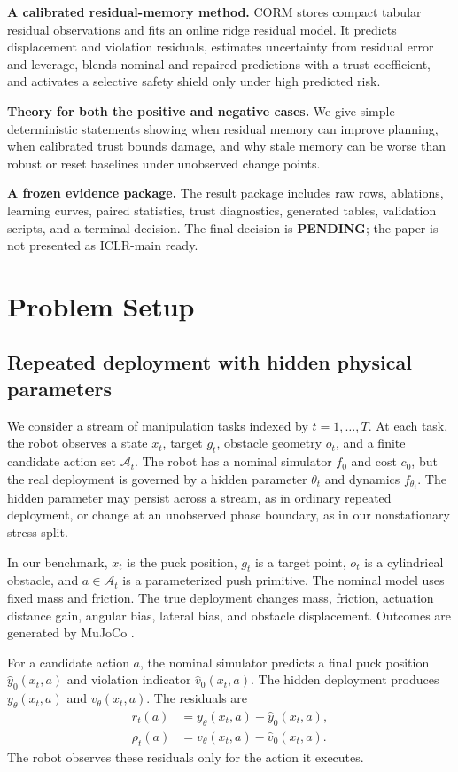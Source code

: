 \documentclass{article}
\newcommand{\TerminalDecision}{PENDING}
\begin{document}
\textbf{A calibrated residual-memory method.} CORM stores compact tabular residual observations and fits an online ridge residual model. It predicts displacement and violation residuals, estimates uncertainty from residual error and leverage, blends nominal and repaired predictions with a trust coefficient, and activates a selective safety shield only under high predicted risk.

\textbf{Theory for both the positive and negative cases.} We give simple deterministic statements showing when residual memory can improve planning, when calibrated trust bounds damage, and why stale memory can be worse than robust or reset baselines under unobserved change points.

\textbf{A frozen evidence package.} The result package includes raw rows, ablations, learning curves, paired statistics, trust diagnostics, generated tables, validation scripts, and a terminal decision. The final decision is \textbf{\TerminalDecision}; the paper is not presented as ICLR-main ready.

\section{Problem Setup}

\subsection{Repeated deployment with hidden physical parameters}

We consider a stream of manipulation tasks indexed by $t=1,\ldots,T$. At each task, the robot observes a state $x_t$, target $g_t$, obstacle geometry $o_t$, and a finite candidate action set $\mathcal{A}_t$. The robot has a nominal simulator $f_0$ and cost $c_0$, but the real deployment is governed by a hidden parameter $\theta_t$ and dynamics $f_{\theta_t}$. The hidden parameter may persist across a stream, as in ordinary repeated deployment, or change at an unobserved phase boundary, as in our nonstationary stress split.

In our benchmark, $x_t$ is the puck position, $g_t$ is a target point, $o_t$ is a cylindrical obstacle, and $a \in \mathcal{A}_t$ is a parameterized push primitive. The nominal model uses fixed mass and friction. The true deployment changes mass, friction, actuation distance gain, angular bias, lateral bias, and obstacle displacement. Outcomes are generated by MuJoCo \citep{todorov2012mujoco}.

For a candidate action $a$, the nominal simulator predicts a final puck position $\hat y_0(x_t,a)$ and violation indicator $\hat v_0(x_t,a)$. The hidden deployment produces $y_\theta(x_t,a)$ and $v_\theta(x_t,a)$. The residuals are
\begin{align}
r_t(a) &= y_\theta(x_t,a)-\hat y_0(x_t,a),\\
\rho_t(a) &= v_\theta(x_t,a)-\hat v_0(x_t,a).
\end{align}
The robot observes these residuals only for the action it executes.
\end{document}
